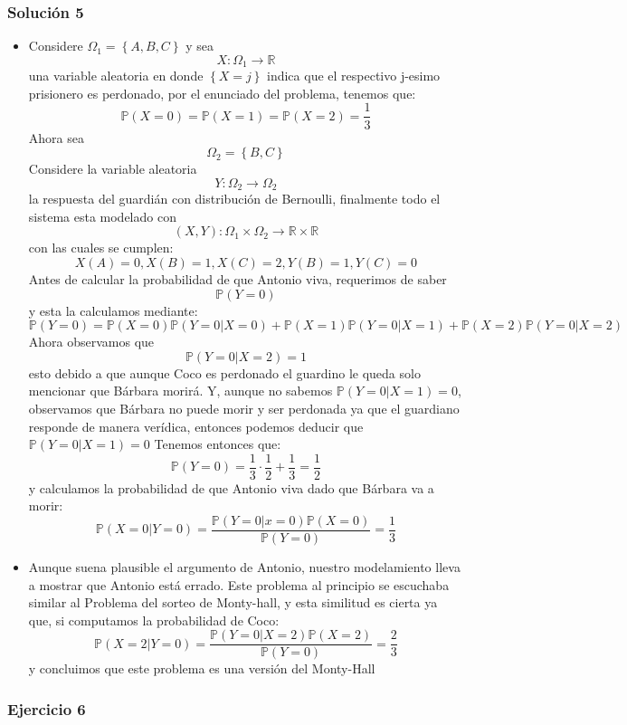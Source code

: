 \documentclass[notitlepage]{article}
\theoremstyle{definition}
\theoremstyle{remark}
\newcommand{\prob}[1]{\mathbb{P}(#1)}
\newcommand{\set}[1]{\left\lbrace #1 \right\rbrace}
\newcommand{\RR}{\mathbb{R}}
\newcommand{\PP}{\mathbb{P}}
\begin{document}
	\subsubsection*{Solución 5}
	\begin{itemize}
		\item Considere $ \Omega_1 = \set{A,B,C} $ y sea \[ X: \Omega_1 \rightarrow \RR \]
		una variable aleatoria en donde $ \set{X = j} $  indica que el respectivo j-esimo prisionero es perdonado, por el enunciado del problema, tenemos que:
		\[ \PP ( X = 0 ) = \PP ( X = 1) = \PP (X = 2 ) = \frac{1}{3} \]
		Ahora sea \[ \Omega_2 = \set{B,C} \]
		Considere la variable aleatoria \[ Y:\Omega_2 \rightarrow \Omega_2  \] la respuesta del guardián con distribución de Bernoulli, finalmente todo el sistema esta modelado con \[ (X,Y) : \Omega_1 \times \Omega_2 \rightarrow \RR \times \RR \]con las cuales se cumplen:
		\[ X(A) = 0, X(B) = 1, X(C) = 2, Y(B) = 1, Y(C) = 0 \]
		Antes de calcular la probabilidad de que Antonio viva, requerimos de saber \[ \PP ( Y = 0) \]
		y esta la calculamos mediante:
		\[ \prob{Y = 0}= \prob{X=0}\prob{Y=0|X=0}+\prob{X=1}\prob{Y=0|X=1}
		+\prob{X=2}\prob{Y=0|X=2} \]
		Ahora observamos que \[ \PP(Y = 0 | X = 2) = 1 \] esto debido a que aunque Coco es perdonado el guardino le queda solo mencionar que Bárbara morirá. 
		Y, aunque no sabemos $  \prob{Y=0|X=1} = 0  $, observamos que Bárbara no puede morir y ser perdonada ya que el guardiano responde de manera verídica, entonces  podemos deducir que $ \prob{Y=0|X=1} = 0 $ 
		Tenemos entonces que:
		\[ \PP (Y = 0) = \frac{1}{3} \cdot \frac{1}{2} + \frac{1}{3} = \frac{1}{2} \]
		y calculamos la probabilidad de que Antonio viva dado que Bárbara va a morir:
		\[ \PP(X = 0 | Y = 0) = \frac{\PP(Y = 0 | x = 0 )\PP(X=0)}{\PP(Y=0) }= \frac{1}{3} \]
		\item
		Aunque suena plausible el argumento de Antonio, nuestro modelamiento lleva a mostrar que Antonio está errado. Este problema al principio se escuchaba similar al Problema del sorteo de Monty-hall, y esta similitud es cierta ya que, si computamos la probabilidad de Coco:
		\[ \prob{X=2|Y=0} = \frac{\prob{Y=0|X=2}\prob{X=2}}{\prob{Y=0}}= \frac{2}{3}  \]
		y concluimos que este problema es una versión del Monty-Hall 
	\end{itemize}
	
	
	\subsubsection*{Ejercicio 6}
	
\end{document}
